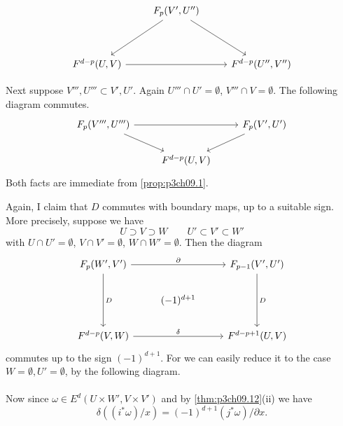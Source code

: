 \documentclass[../main]{subfiles}
\begin{document}
\[
\begin{tikzcd}
                          & {F_p(V',U'')} \arrow[ldd] \arrow[rdd] &                    \\
                          &                                       &                    \\
{F^{d-p}(U,V)} \arrow[rr] &                                       & {F^{d-p}(U'',V'')}
\end{tikzcd}
\]


Next suppose $V''',U''' \subset V',U'$. Again $U''' \cap U' = \emptyset$, $V''' \cap V = \emptyset$. The following diagram commutes.
\[
\begin{tikzcd}
{F_p(V''', U''')} \arrow[rd] \arrow[rr] &                   & {F_p(V', U')} \arrow[ld] \\
                                        & {F^{d - p}(U, V)} &                         
\end{tikzcd}
\]
Both facts are immediate from \ref{prop:p3ch09.1}.

Again, I claim that $D$ commutes with boundary maps, up to a suitable sign. More precisely, suppose we have
\[U \supset V \supset W \qquad U' \subset V' \subset W'\]
with $U \cap U' = \emptyset$, $V \cap V' = \emptyset$, $W \cap W' = \emptyset$. Then the diagram
\[
\begin{tikzcd}
{F_p(W', V')} \arrow[rr, "\partial"] \arrow[dd, "D"] &              & {F_{p - 1}(V', U')} \arrow[dd, "D"] \\
                                                     & (-1)^{d + 1} &                                     \\
{F^{d - p}(V, W)} \arrow[rr, "\delta"]               &              & {F^{d - p + 1}(U, V)}              
\end{tikzcd}
\]
commutes up to the sign $(-1)^{d+1}$. For we can easily reduce it to the case $W = \emptyset, U' = \emptyset$, by the following diagram.
\\
\\
Now since $\omega \in E^d(U \times W',V \times V')$ and by \ref{thm:p3ch09.12}(ii) we have
\[\delta((i^* \omega)/x) = (-1)^{d+1}(j^* \omega)/\partial x.\]
\end{document}
